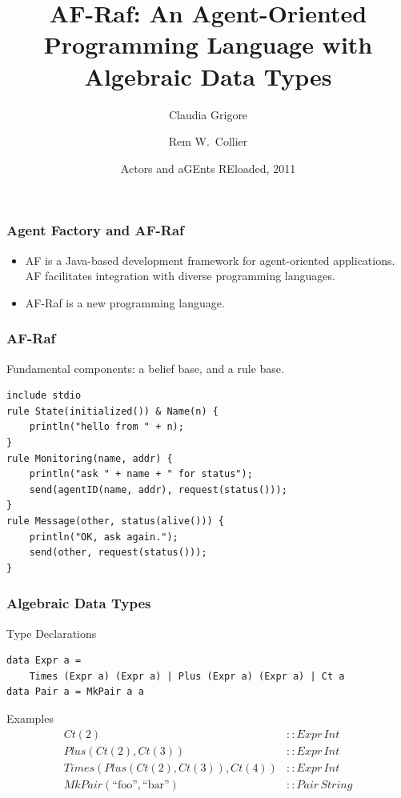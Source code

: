 \documentclass{beamer}
\title{AF-Raf: An Agent-Oriented Programming Language with Algebraic Data Types}
\author{Claudia Grigore \and Rem W.~Collier}
\institute{
  School of Computer Science\\
  University College Dublin\\
  IRCSET}
\date[AGERE~2011]{Actors and aGEnts REloaded, 2011}
\begin{document}
\begin{frame}
  \titlepage
\end{frame}

\begin{frame}
\frametitle{Agent Factory and AF-Raf}
\begin{itemize}
\item
  AF is a Java-based development framework for agent-oriented applications.
  AF facilitates integration with diverse programming languages.
\item
  AF-Raf is a new programming language.
\end{itemize}
\end{frame}

\begin{frame}[fragile]
\frametitle{AF-Raf}
Fundamental components: a belief base, and a rule base.
\medskip
\begin{Verbatim}
include stdio
rule State(initialized()) & Name(n) {
    println("hello from " + n);
}
rule Monitoring(name, addr) {
    println("ask " + name + " for status");
    send(agentID(name, addr), request(status()));
}
rule Message(other, status(alive())) {
    println("OK, ask again.");
    send(other, request(status()));
}
\end{Verbatim}

\end{frame}

\begin{frame}[fragile]
\frametitle{Algebraic Data Types}
\begin{block}{Type Declarations}
\begin{lstlisting}
data Expr a =
    Times (Expr a) (Expr a) | Plus (Expr a) (Expr a) | Ct a
data Pair a = MkPair a a
\end{lstlisting}
\end{block}
\begin{block}{Examples}
{ \def\.#1({\mathit{#1}(}
  \def\ei{\mathit{Expr}\,\mathit{Int}}
\begin{align*}
\.Ct(2) &::\ei\\
\.Plus(\.Ct(2),\.Ct(3)) &::\ei \\
\.Times(\.Plus(\.Ct(2),\.Ct(3)),\.Ct(4)) &::\ei \\
\.MkPair(\text{``foo''}, \text{``bar''}) &:: \mathit{Pair}\,\mathit{String}
\end{align*}}
\end{block}
\end{frame}
\end{document}
